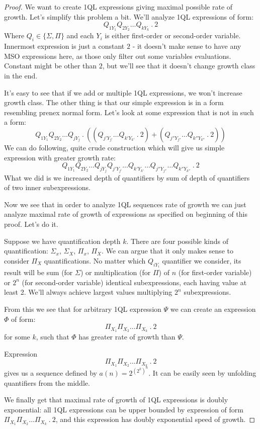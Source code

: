 \documentclass[12pt]{article}
\theoremstyle{definition}
\begin{document}
\begin{proof}
We want to create 1QL expressions giving maximal possible rate of growth. Let's simplify this problem a bit. We'll analyze 1QL expressions of form:
$$Q_{1Y_1}Q_{2Y_2} \ldots Q_{kY_k} \ . \ 2$$
Where $Q_i \in \{ \Sigma, \Pi \}$ and each $Y_i$ is either first-order or second-order variable. Innermost expression is just a constant $2$ - it doesn't make sense to have any MSO expressions here, as those only filter out some variables evaluations. Constant might be other than $2$, but we'll see that it doesn't change growth class in the end. 

It's easy to see that if we add or multiple 1QL expressions, we won't increase growth class. The other thing is that our simple expression is in a form resembling prenex normal form. Let's look at some expression that is not in such a form:
$$Q_{1Y_1}Q_{2Y_2} \ldots Q_{jY_j} \ . \ ((Q_{j'Y_{j'}} \ldots Q_{k'Y_{k'}} \ . \ 2) + (Q_{j''Y_{j''}} \ldots Q_{k''Y_{k''}} \ . \ 2))$$
We can do following, quite crude construction which will give us simple expression with greater growth rate:
$$Q_{1Y_1}Q_{2Y_2} \ldots Q_{jY_j}Q_{j'Y_{j'}} \ldots Q_{k'Y_{k'}} \ldots Q_{j''Y_{j''}} \ldots Q_{k''Y_{k''}} \ . \ 2$$
What we did is we increased depth of quantifiers by sum of depth of quantifiers of two inner subexpressions. 

Now we see that in order to analyze 1QL sequences rate of growth we can just analyze maximal rate of growth of expressions as specified on beginning of this proof. Let's do it.

Suppose we have quantification depth $k$. There are four possible kinds of quantification: $\Sigma_x$, $\Sigma_X$, $\Pi_x$, $\Pi_X$. We can argue that it only makes sense to consider $\Pi_X$ quantifications. No matter which $Q_{iY_i}$ quantifier we consider, its result will be sum (for $\Sigma$) or multiplication (for $\Pi$) of $n$ (for first-order variable) or $2^n$ (for second-order variable) identical subexpressions, each having value at least 2. We'll always achieve largest values multiplying $2^n$ subexpressions. 

From this we see that for arbitrary 1QL expression $\varPsi$ we can create an expression $\varPhi$ of form:
$$\Pi_{X_1}\Pi_{X_2}\ldots \Pi_{X_k} \ . \ 2$$
for some $k$, such that $\varPhi$ has greater rate of growth than $\varPsi$. 

Expression $$\Pi_{X_1}\Pi_{X_2}\ldots \Pi_{X_k} \ . \ 2$$ gives us a sequence defined by $a(n) = 2^{(2^k)^n}$. It can be easily seen by unfolding quantifiers from the middle.

We finally get that maximal rate of growth of 1QL expressions is doubly exponential: all 1QL expressions can be upper bounded by expression of form $\Pi_{X_1}\Pi_{X_2}\ldots \Pi_{X_k} \ . \ 2$, and this expression has doubly exponential speed of growth.
\end{proof}
\end{document}

